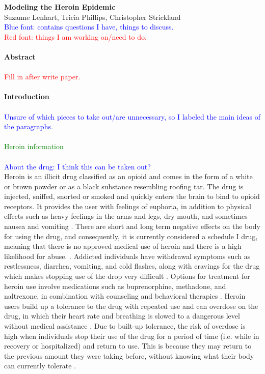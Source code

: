 \documentclass[12pt]{article}
\begin{document}
\textbf{\large{Modeling the Heroin Epidemic}} \\
Suzanne Lenhart, Tricia Phillips, Christopher Strickland \\

\textcolor{blue}{Blue font: contains questions I have, things to discuss.} \\
\textcolor{red}{Red font: things I am working on/need to do.} \\ \\
\textbf{Abstract} \\ \\
\textcolor{red}{Fill in after write paper.} \\ \\
\textbf{Introduction} \\ \\
\textcolor{blue}{Unsure of which pieces to take out/are unnecessary, so I labeled the main ideas of the paragraphs.} \\ \\
\textcolor{green}{Heroin information} \\ \\
\textcolor{blue}{About the drug: I think this can be taken out?} \\
Heroin is an illicit drug classified as an opioid and comes in the form of a white or brown powder or as a black substance resembling roofing tar. The drug is injected, sniffed, snorted or smoked and quickly enters the brain to bind to opioid receptors. It provides the user with feelings of euphoria, in addition to physical effects such as heavy feelings in the arms and legs, dry mouth, and sometimes nausea and vomiting \cite{NIH1, NIDA2}. There are short and long term negative effects on the body for using the drug, and consequently, it is currently considered a schedule I drug, meaning that there is no approved medical use of heroin and there is a high likelihood for abuse. \cite{DEA1, NIH1}. Addicted individuals have withdrawal symptoms such as restlessness, diarrhea, vomiting, and cold flashes, along with cravings for the drug which makes stopping use of the drop very difficult \cite{NIH1}. Options for treatment for heroin use involve medications such as buprenorphine, methadone, and naltrexone, in combination with counseling and behavioral therapies \cite{SAMSHA1, NIH1}. Heroin users build up a tolerance to the drug with repeated use and can overdose on the drug, in which their heart rate and breathing is slowed to a dangerous level without medical assistance \cite{NIDA2, NIH1}. Due to built-up tolerance, the risk of overdose is high when individuals stop their use of the drug for a period of time (i.e. while in recovery or hospitalized) and return to use. This is because they may return to the previous amount they were taking before, without knowing what their body can currently tolerate \cite{NIH2}.  
\end{document}
